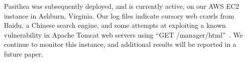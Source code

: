 Pasithea was subsequently deployed, and is currently active, on our AWS EC2 instance in Ashburn, Virginia. 
Our log files indicate cursory web crawls from Baidu, a Chinese search engine, and some attempts at exploiting a known vulnerability in Apache Tomcat web servers using ``GET /manager/html''~\cite{Tomcat-Exploit}. 
We continue to monitor this instance, and additional results will be reported in a future paper.
